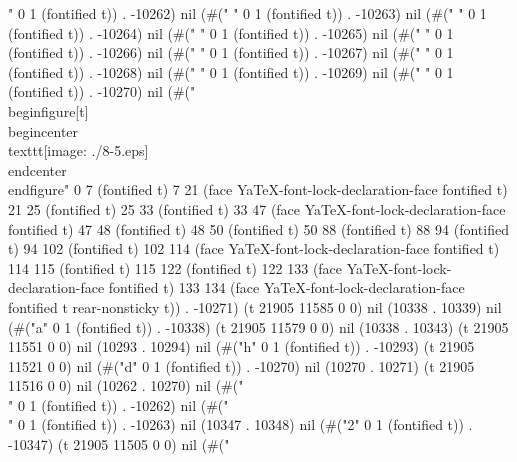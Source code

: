 " 0 1 (fontified t)) . -10262) nil (#("	" 0 1 (fontified t)) . -10263) nil (#(" " 0 1 (fontified t)) . -10264) nil (#(" " 0 1 (fontified t)) . -10265) nil (#(" " 0 1 (fontified t)) . -10266) nil (#(" " 0 1 (fontified t)) . -10267) nil (#(" " 0 1 (fontified t)) . -10268) nil (#(" " 0 1 (fontified t)) . -10269) nil (#("
" 0 1 (fontified t)) . -10270) nil (#("	      \\begin{figure}[t]
	       \\begin{center}
		\\texttt{[image: ./8-5.eps]}
	       \\end{center}
	      \\end{figure}" 0 7 (fontified t) 7 21 (face YaTeX-font-lock-declaration-face fontified t) 21 25 (fontified t) 25 33 (fontified t) 33 47 (face YaTeX-font-lock-declaration-face fontified t) 47 48 (fontified t) 48 50 (fontified t) 50 88 (fontified t) 88 94 (fontified t) 94 102 (fontified t) 102 114 (face YaTeX-font-lock-declaration-face fontified t) 114 115 (fontified t) 115 122 (fontified t) 122 133 (face YaTeX-font-lock-declaration-face fontified t) 133 134 (face YaTeX-font-lock-declaration-face fontified t rear-nonsticky t)) . -10271) (t 21905 11585 0 0) nil (10338 . 10339) nil (#("a" 0 1 (fontified t)) . -10338) (t 21905 11579 0 0) nil (10338 . 10343) (t 21905 11551 0 0) nil (10293 . 10294) nil (#("h" 0 1 (fontified t)) . -10293) (t 21905 11521 0 0) nil (#("d" 0 1 (fontified t)) . -10270) nil (10270 . 10271) (t 21905 11516 0 0) nil (10262 . 10270) nil (#("\\" 0 1 (fontified t)) . -10262) nil (#("\\" 0 1 (fontified t)) . -10263) nil (10347 . 10348) nil (#("2" 0 1 (fontified t)) . -10347) (t 21905 11505 0 0) nil (#("
